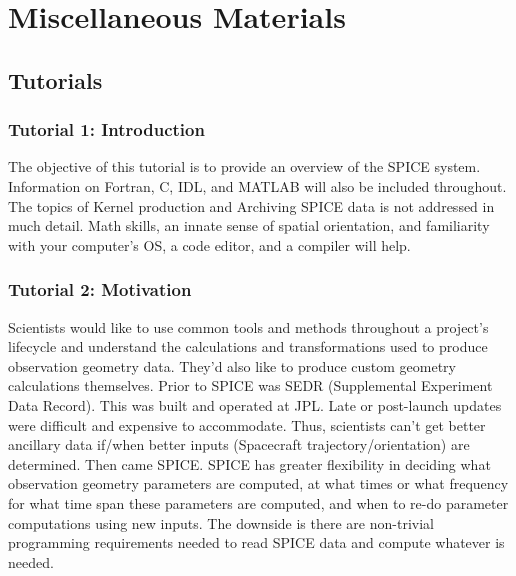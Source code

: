 \documentclass[crop=false,class=article,oneside]{standalone}
\begin{document}
    \ifx\ifphysicscourseselectromagnetismI\undefined
        \section*{Miscellaneous Materials}
        \setcounter{section}{1}
    \fi
    \subsection{Tutorials}
        \subsubsection{Tutorial 1: Introduction}
            The objective of this tutorial is to
            provide an overview of the SPICE system.
            Information on Fortran, C, IDL, and MATLAB
            will also be included throughout.
            The topics of Kernel production and
            Archiving SPICE data is not addressed in
            much detail. Math skills, an innate sense
            of spatial orientation, and familiarity with
            your computer's OS, a code editor,
            and a compiler will help. 
        \subsubsection{Tutorial 2: Motivation}
            Scientists would like to use common tools and
            methods throughout a project's lifecycle and
            understand the calculations and transformations
            used to produce observation geometry data. They'd
            also like to produce custom geometry calculations
            themselves. Prior to SPICE was SEDR
            (Supplemental Experiment Data Record). This was
            built and operated at JPL. Late or post-launch
            updates were difficult and expensive to accommodate.
            Thus, scientists can't get better ancillary data
            if/when better inputs
            (Spacecraft trajectory/orientation) are determined.
            Then came SPICE. SPICE has greater flexibility in
            deciding what observation geometry parameters are
            computed, at what times or what frequency for what
            time span these parameters are computed, and when to
            re-do parameter computations using new inputs. The
            downside is there are non-trivial programming
            requirements needed to read SPICE data and compute
            whatever is needed.
\end{document}
